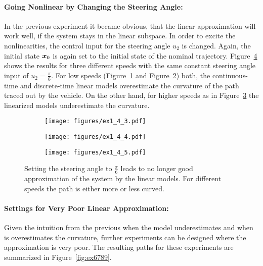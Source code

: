 \paragraph{Going Nonlinear by Changing the Steering Angle: }
In the previous experiment it became obvious, that the linear approximation will work well, if the system stays in the linear subspace.
In order to excite the nonlinearities, the control input for the steering angle $u_2$ is changed.
Again, the initial state $\boldsymbol{x}_0$ is again set to the initial state of the nominal trajectory.
Figure~\ref{fig:ex345} shows the results for three different speeds with the same constant steering angle input of $u_2 = \frac{\pi}{6}$.
For low speeds (Figure~\ref{fig:ex3} and Figure~\ref{fig:ex4}) both, the continuous-time and discrete-time linear models overestimate the curvature of the path traced out by the vehicle.
On the other hand, for higher speeds as in Figure~\ref{fig:ex5} the linearized models underestimate the curvature.

\begin{figure}[h]
	\centering
	\begin{subfigure}{0.32\textwidth}
		\texttt{[image: figures/ex1\_4\_3.pdf]}
		\label{fig:ex3}
	\end{subfigure}
	\begin{subfigure}{0.32\textwidth}
		\texttt{[image: figures/ex1\_4\_4.pdf]}
		\label{fig:ex4}
	\end{subfigure}
	\begin{subfigure}{0.32\textwidth}
		\texttt{[image: figures/ex1\_4\_5.pdf]}
		\label{fig:ex5}
	\end{subfigure}
	\caption{Setting the steering angle to $\frac{\pi}{6}$ leads to no longer good approximation of the system by the linear models. For different speeds the path is either more or less curved.}
	\label{fig:ex345}
\end{figure}

\paragraph{Settings for Very Poor Linear Approximation: }
Given the intuition from the previous when the model underestimates and when is overestimates the curvature, further experiments can be designed where the approximation is very poor. 
The resulting paths for these experiments are summarized in Figure~\ref{fig:ex6789}.

